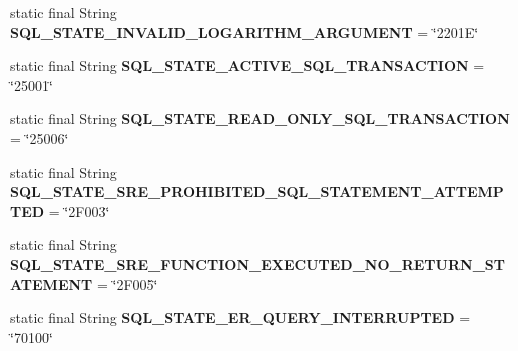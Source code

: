 \begin{DoxyCompactItemize}
static final String {\bfseries S\+Q\+L\+\_\+\+S\+T\+A\+T\+E\+\_\+\+I\+N\+V\+A\+L\+I\+D\+\_\+\+L\+O\+G\+A\+R\+I\+T\+H\+M\+\_\+\+A\+R\+G\+U\+M\+E\+NT} = \char`\"{}2201\+E\char`\"{}
\item 
\mbox{\label{classcom_1_1mysql_1_1cj_1_1exceptions_1_1_mysql_error_numbers_af1cc6084869675f2083afa0e0a9ca5ae}} 
static final String {\bfseries S\+Q\+L\+\_\+\+S\+T\+A\+T\+E\+\_\+\+A\+C\+T\+I\+V\+E\+\_\+\+S\+Q\+L\+\_\+\+T\+R\+A\+N\+S\+A\+C\+T\+I\+ON} = \char`\"{}25001\char`\"{}
\item 
\mbox{\label{classcom_1_1mysql_1_1cj_1_1exceptions_1_1_mysql_error_numbers_a07b42b47f1f5fe9a1fcc59123bb370c0}} 
static final String {\bfseries S\+Q\+L\+\_\+\+S\+T\+A\+T\+E\+\_\+\+R\+E\+A\+D\+\_\+\+O\+N\+L\+Y\+\_\+\+S\+Q\+L\+\_\+\+T\+R\+A\+N\+S\+A\+C\+T\+I\+ON} = \char`\"{}25006\char`\"{}
\item 
\mbox{\label{classcom_1_1mysql_1_1cj_1_1exceptions_1_1_mysql_error_numbers_af95d651aaf3458f429cf92ffb172dd04}} 
static final String {\bfseries S\+Q\+L\+\_\+\+S\+T\+A\+T\+E\+\_\+\+S\+R\+E\+\_\+\+P\+R\+O\+H\+I\+B\+I\+T\+E\+D\+\_\+\+S\+Q\+L\+\_\+\+S\+T\+A\+T\+E\+M\+E\+N\+T\+\_\+\+A\+T\+T\+E\+M\+P\+T\+ED} = \char`\"{}2\+F003\char`\"{}
\item 
\mbox{\label{classcom_1_1mysql_1_1cj_1_1exceptions_1_1_mysql_error_numbers_a5560a3aa8c1317ea55745eb1bada2c6e}} 
static final String {\bfseries S\+Q\+L\+\_\+\+S\+T\+A\+T\+E\+\_\+\+S\+R\+E\+\_\+\+F\+U\+N\+C\+T\+I\+O\+N\+\_\+\+E\+X\+E\+C\+U\+T\+E\+D\+\_\+\+N\+O\+\_\+\+R\+E\+T\+U\+R\+N\+\_\+\+S\+T\+A\+T\+E\+M\+E\+NT} = \char`\"{}2\+F005\char`\"{}
\item 
\mbox{\label{classcom_1_1mysql_1_1cj_1_1exceptions_1_1_mysql_error_numbers_add4bb8e6941fa22c8e2891f39f6eb3aa}} 
static final String {\bfseries S\+Q\+L\+\_\+\+S\+T\+A\+T\+E\+\_\+\+E\+R\+\_\+\+Q\+U\+E\+R\+Y\+\_\+\+I\+N\+T\+E\+R\+R\+U\+P\+T\+ED} = \char`\"{}70100\char`\"{}
\item 
\mbox{\label{classcom_1_1mysql_1_1cj_1_1exceptions_1_1_mysql_error_numbers_a0bc7617eec35f56c95736573030ab8a2}} 

\end{DoxyCompactItemize}
